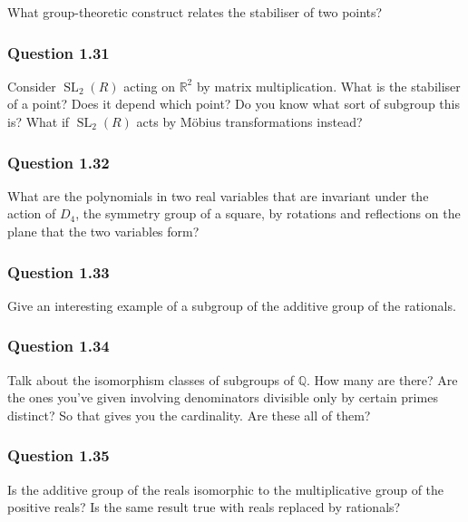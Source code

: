 What group-theoretic construct relates the stabiliser of two points?

\hypertarget{question-1.31}{%
\subsubsection{Question 1.31}\label{question-1.31}}

Consider \({\operatorname{SL}}_2(R)\) acting on \({\mathbb{R}}^2\) by
matrix multiplication. What is the stabiliser of a point? Does it depend
which point? Do you know what sort of subgroup this is? What if
\({\operatorname{SL}}_2(R)\) acts by Möbius transformations instead?

\hypertarget{question-1.32}{%
\subsubsection{Question 1.32}\label{question-1.32}}

What are the polynomials in two real variables that are invariant under
the action of \(D_4\), the symmetry group of a square, by rotations and
reflections on the plane that the two variables form?

\hypertarget{question-1.33}{%
\subsubsection{Question 1.33}\label{question-1.33}}

Give an interesting example of a subgroup of the additive group of the
rationals.

\hypertarget{question-1.34}{%
\subsubsection{Question 1.34}\label{question-1.34}}

Talk about the isomorphism classes of subgroups of \({\mathbb{Q}}\). How
many are there? Are the ones you've given involving denominators
divisible only by certain primes distinct? So that gives you the
cardinality. Are these all of them?

\hypertarget{question-1.35}{%
\subsubsection{Question 1.35}\label{question-1.35}}

Is the additive group of the reals isomorphic to the multiplicative
group of the positive reals? Is the same result true with reals replaced
by rationals?

